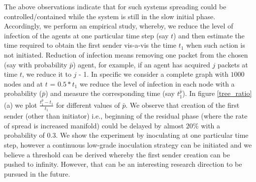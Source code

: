 The above observations indicate 
that for such systems spreading could be controlled/contained while the system is still in the slow initial phase. 
Accordingly, we perform an empirical study, whereby, we reduce the level of infection of the agents at one particular time step (say $t$) and then estimate the time required to obtain the first sender vis-a-vis the time $t_1$ when 
such action is not initiated. 
Reduction of infection means removing one packet from the chosen (say with probability $\bar p$)  agent, for example, if an agent has acquired $j$ packets at time $t$, we reduce it to $j$ - 1.  
In specific we consider a complete graph with $1000$ nodes and at $t$ =  $0.5 \ast t_1$  
we reduce the level of infection in each node with a probability ($\bar p$) and measure the corresponding time (say  $t_{1}^{\bar p}$). 
In figure \ref{tree_ratio}(a) we plot $\frac{t_{1}^{\bar p} - t_1}{t_1}$ for different values of $\bar p$. 
We observe that creation of the first sender (other than initiator) i.e.,
beginning of the residual phase (where the rate of spread is increased manifold) could be delayed by almost $20\%$ with a probability of $0.3$. 
We show the experiment by inoculating at one particular time step, however a continuous low-grade inoculation strategy can be
initiated and we believe a threshold can be derived whereby the first sender creation can be pushed to infinity. However, that 
can be an interesting research direction to be pursued in the future.

\iffalse
{}


